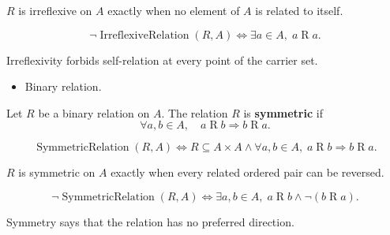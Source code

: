 \begin{remark*}
$R$ is irreflexive on $A$ exactly when no element of $A$ is related to itself.
\end{remark*}

\begin{remark*}
\[
\neg\operatorname{IrreflexiveRelation}(R,A)
\Longleftrightarrow
\exists a\in A,\; a\mathrel{R}a.
\]
\end{remark*}

\begin{remark*}[Interpretation]
Irreflexivity forbids self-relation at every point of the carrier set.
\end{remark*}

\begin{remark*}[Dependencies]
\begin{itemize}
  \item Binary relation.
\end{itemize}
\end{remark*}

\begin{definition}
\label{def:rel-symmetric}
Let $R$ be a binary relation on $A$.
The relation $R$ is \textbf{symmetric} if
\[
\forall a,b \in A,\quad
a \mathrel{R} b \Rightarrow b \mathrel{R} a.
\]
\end{definition}

\begin{remark*}
\[
\operatorname{SymmetricRelation}(R,A)
\Longleftrightarrow
R\subseteq A\times A
\land
\forall a,b\in A,\; a\mathrel{R}b \Rightarrow b\mathrel{R}a.
\]
\end{remark*}

\begin{remark*}
$R$ is symmetric on $A$ exactly when every related ordered pair can be reversed.
\end{remark*}

\begin{remark*}
\[
\neg\operatorname{SymmetricRelation}(R,A)
\Longleftrightarrow
\exists a,b\in A,\; a\mathrel{R}b \land \lnot(b\mathrel{R}a).
\]
\end{remark*}

\begin{remark*}[Interpretation]
Symmetry says that the relation has no preferred direction.
\end{remark*}

